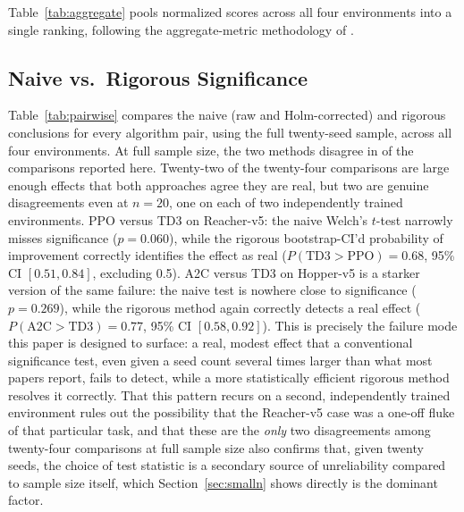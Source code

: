 \documentclass[journal]{IEEEtran}
\begin{document}


Table~\ref{tab:aggregate} pools normalized scores across all four environments into a single
ranking, following the aggregate-metric methodology of \cite{agarwal2021deep}.



\subsection{Naive vs.\ Rigorous Significance}

Table~\ref{tab:pairwise} compares the naive (raw and Holm-corrected) and rigorous conclusions for
every algorithm pair, using the full twenty-seed sample, across all four environments. At full
sample size, the two methods disagree in  of the
comparisons reported here. Twenty-two of the twenty-four comparisons are large enough effects that
both approaches agree they are real, but two are genuine disagreements even at $n=20$, one on each
of two independently trained environments. PPO versus TD3 on Reacher-v5: the naive Welch's
$t$-test narrowly misses significance ($p=0.060$), while the rigorous bootstrap-CI'd probability
of improvement correctly identifies the effect as real ($P(\text{TD3}>\text{PPO})=0.68$, 95\% CI
$[0.51, 0.84]$, excluding 0.5). A2C versus TD3 on Hopper-v5 is a starker version of the same
failure: the naive test is nowhere close to significance ($p=0.269$), while the rigorous method
again correctly detects a real effect ($P(\text{A2C}>\text{TD3})=0.77$, 95\% CI $[0.58, 0.92]$).
This is precisely the failure mode this paper is designed to surface: a real, modest effect that a
conventional significance test, even given a seed count several times larger than what most papers
report, fails to detect, while a more statistically efficient rigorous method resolves it
correctly. That this pattern recurs on a second, independently trained environment rules out the
possibility that the Reacher-v5 case was a one-off fluke of that particular task, and that these
are the \emph{only} two disagreements among twenty-four comparisons at full sample size also
confirms that, given twenty seeds, the choice of test statistic is a secondary source of
unreliability compared to sample size itself, which Section~\ref{sec:smalln} shows directly is the
dominant factor.
\end{document}
